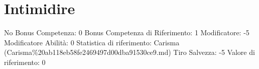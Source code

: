\section{Intimidire}\label{intimidire}

\begin{description}
\tightlist
\item[Tags: ABI]
No Bonus Competenza: 0 Bonus Competenza di Riferimento: 1 Modificatore:
-5 Modificatore Abilità: 0 Statistica di riferimento: Carisma
(Carisma\%20ab118eb58fe2469497d00dba91530ce9.md) Tiro Salvezza: -5
Valore di riferimento: 0
\end{description}
